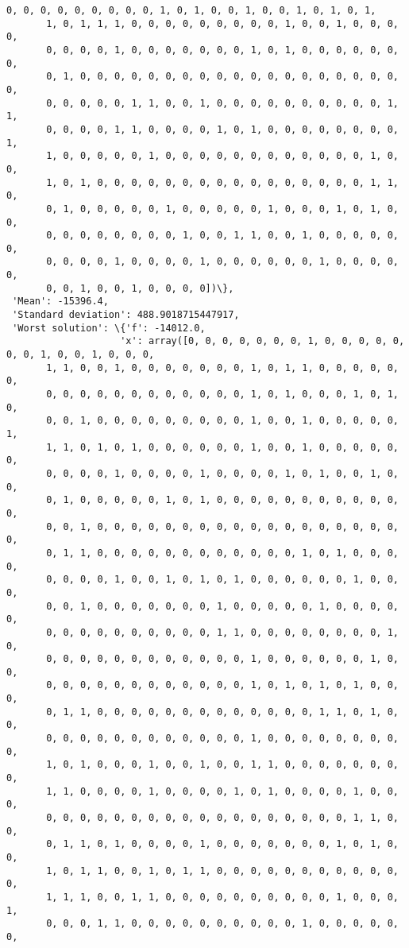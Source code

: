 \documentclass[11pt]{article}
\begin{document}
\begin{Verbatim}[commandchars=\\\{\}]
       0, 0, 0, 0, 0, 0, 0, 0, 0, 1, 0, 1, 0, 0, 1, 0, 0, 1, 0, 1, 0, 1,
       1, 0, 1, 1, 1, 0, 0, 0, 0, 0, 0, 0, 0, 0, 1, 0, 0, 1, 0, 0, 0, 0,
       0, 0, 0, 0, 1, 0, 0, 0, 0, 0, 0, 0, 1, 0, 1, 0, 0, 0, 0, 0, 0, 0,
       0, 1, 0, 0, 0, 0, 0, 0, 0, 0, 0, 0, 0, 0, 0, 0, 0, 0, 0, 0, 0, 0,
       0, 0, 0, 0, 0, 1, 1, 0, 0, 1, 0, 0, 0, 0, 0, 0, 0, 0, 0, 0, 1, 1,
       0, 0, 0, 0, 1, 1, 0, 0, 0, 0, 1, 0, 1, 0, 0, 0, 0, 0, 0, 0, 0, 1,
       1, 0, 0, 0, 0, 0, 1, 0, 0, 0, 0, 0, 0, 0, 0, 0, 0, 0, 0, 1, 0, 0,
       1, 0, 1, 0, 0, 0, 0, 0, 0, 0, 0, 0, 0, 0, 0, 0, 0, 0, 0, 1, 1, 0,
       0, 1, 0, 0, 0, 0, 0, 1, 0, 0, 0, 0, 0, 1, 0, 0, 0, 1, 0, 1, 0, 0,
       0, 0, 0, 0, 0, 0, 0, 0, 1, 0, 0, 1, 1, 0, 0, 1, 0, 0, 0, 0, 0, 0,
       0, 0, 0, 0, 1, 0, 0, 0, 0, 1, 0, 0, 0, 0, 0, 0, 1, 0, 0, 0, 0, 0,
       0, 0, 1, 0, 0, 1, 0, 0, 0, 0])\},
 'Mean': -15396.4,
 'Standard deviation': 488.9018715447917,
 'Worst solution': \{'f': -14012.0,
                    'x': array([0, 0, 0, 0, 0, 0, 0, 1, 0, 0, 0, 0, 0, 0, 0, 1, 0, 0, 1, 0, 0, 0,
       1, 1, 0, 0, 1, 0, 0, 0, 0, 0, 0, 0, 1, 0, 1, 1, 0, 0, 0, 0, 0, 0,
       0, 0, 0, 0, 0, 0, 0, 0, 0, 0, 0, 0, 1, 0, 1, 0, 0, 0, 1, 0, 1, 0,
       0, 0, 1, 0, 0, 0, 0, 0, 0, 0, 0, 0, 1, 0, 0, 1, 0, 0, 0, 0, 0, 1,
       1, 1, 0, 1, 0, 1, 0, 0, 0, 0, 0, 0, 1, 0, 0, 1, 0, 0, 0, 0, 0, 0,
       0, 0, 0, 0, 1, 0, 0, 0, 0, 1, 0, 0, 0, 0, 1, 0, 1, 0, 0, 1, 0, 0,
       0, 1, 0, 0, 0, 0, 0, 1, 0, 1, 0, 0, 0, 0, 0, 0, 0, 0, 0, 0, 0, 0,
       0, 0, 1, 0, 0, 0, 0, 0, 0, 0, 0, 0, 0, 0, 0, 0, 0, 0, 0, 0, 0, 0,
       0, 1, 1, 0, 0, 0, 0, 0, 0, 0, 0, 0, 0, 0, 0, 1, 0, 1, 0, 0, 0, 0,
       0, 0, 0, 0, 1, 0, 0, 1, 0, 1, 0, 1, 0, 0, 0, 0, 0, 0, 1, 0, 0, 0,
       0, 0, 1, 0, 0, 0, 0, 0, 0, 0, 1, 0, 0, 0, 0, 0, 1, 0, 0, 0, 0, 0,
       0, 0, 0, 0, 0, 0, 0, 0, 0, 0, 1, 1, 0, 0, 0, 0, 0, 0, 0, 0, 1, 0,
       0, 0, 0, 0, 0, 0, 0, 0, 0, 0, 0, 0, 1, 0, 0, 0, 0, 0, 0, 1, 0, 0,
       0, 0, 0, 0, 0, 0, 0, 0, 0, 0, 0, 0, 1, 0, 1, 0, 1, 0, 1, 0, 0, 0,
       0, 1, 1, 0, 0, 0, 0, 0, 0, 0, 0, 0, 0, 0, 0, 0, 1, 1, 0, 1, 0, 0,
       0, 0, 0, 0, 0, 0, 0, 0, 0, 0, 0, 0, 1, 0, 0, 0, 0, 0, 0, 0, 0, 0,
       1, 0, 1, 0, 0, 0, 1, 0, 0, 1, 0, 0, 1, 1, 0, 0, 0, 0, 0, 0, 0, 0,
       1, 1, 0, 0, 0, 0, 1, 0, 0, 0, 0, 1, 0, 1, 0, 0, 0, 0, 1, 0, 0, 0,
       0, 0, 0, 0, 0, 0, 0, 0, 0, 0, 0, 0, 0, 0, 0, 0, 0, 0, 1, 1, 0, 0,
       0, 1, 1, 0, 1, 0, 0, 0, 0, 1, 0, 0, 0, 0, 0, 0, 0, 1, 0, 1, 0, 0,
       1, 0, 1, 1, 0, 0, 1, 0, 1, 1, 0, 0, 0, 0, 0, 0, 0, 0, 0, 0, 0, 0,
       1, 1, 1, 0, 0, 1, 1, 0, 0, 0, 0, 0, 0, 0, 0, 0, 0, 1, 0, 0, 0, 1,
       0, 0, 0, 1, 1, 0, 0, 0, 0, 0, 0, 0, 0, 0, 0, 1, 0, 0, 0, 0, 0, 0,

\end{Verbatim}
\end{document}
